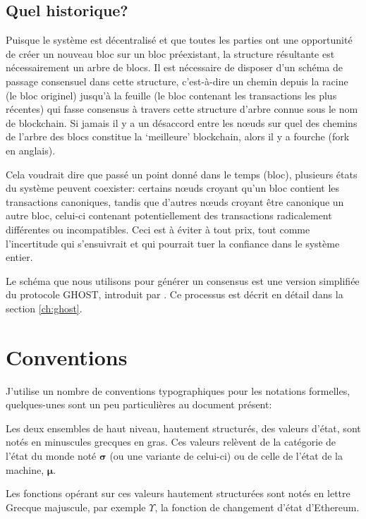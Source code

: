 \documentclass[9pt,oneside]{amsart}
\begin{document}
\begin{multicols}{2}
\subsection{Quel historique?}

Puisque le système est décentralisé et que toutes les parties ont une opportunité de créer un nouveau bloc sur un bloc préexistant, la structure résultante est nécessairement un arbre de blocs. Il est nécessaire de disposer d’un schéma de passage consensuel dans cette structure, c’est-à-dire un chemin depuis la racine (le bloc originel) jusqu'à la feuille (le bloc contenant les transactions les plus récentes) qui fasse consensus à travers cette structure d'arbre connue sous le nom de blockchain. Si jamais il y a un désaccord entre les n\oe{}uds sur quel des chemins de l'arbre des blocs constitue la `meilleure' blockchain, alors il y a fourche (fork en anglais).  

Cela voudrait dire que passé un point donné dans le temps (bloc), plusieurs états du système peuvent coexister: certains n\oe{}uds croyant qu'un bloc contient les transactions canoniques, tandis que d'autres n\oe{}uds croyant être canonique un autre bloc, celui-ci contenant potentiellement des transactions radicalement différentes ou incompatibles. Ceci est à éviter à tout prix, tout comme l'incertitude qui s'ensuivrait et qui pourrait tuer la confiance dans le système entier. 

Le schéma que nous utilisons pour générer un consensus est une version simplifiée du protocole GHOST, introduit par \cite{cryptoeprint:2013:881}. Ce processus est décrit en détail dans la section \ref{ch:ghost}.

\section{Conventions}\label{ch:conventions}

J'utilise un nombre de conventions typographiques pour les notations formelles, quelques-unes sont un peu particulières au document présent:

Les deux ensembles de haut niveau, hautement structurés, des valeurs d'état, sont notés en minuscules grecques en gras. Ces valeurs relèvent de la catégorie de l'état du monde noté $\boldsymbol{\sigma}$ (ou une variante de celui-ci) ou de celle de l'état de la machine, $\boldsymbol{\mu}$.

Les fonctions opérant sur ces valeurs hautement structurées sont notés en lettre Grecque majuscule, par exemple $\Upsilon$, la fonction de changement d'état d'Ethereum.


\end{multicols}
\end{document}
